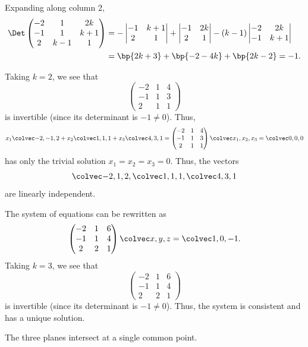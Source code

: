 \begin{solution}
    \begin{ppart}
        Expanding along column 2,
        \begin{align*}
            \Det \begin{pmatrix}-2 & 1 & 2k\\ -1 & 1 & k+1\\ 2 & k-1 & 1\end{pmatrix} &= -\begin{vmatrix}-1 & k+1 \\ 2 & 1\end{vmatrix} + \begin{vmatrix}-1 & 2k \\ 2 & 1\end{vmatrix} - (k-1) \begin{vmatrix}-2 & 2k \\ -1 & k + 1\end{vmatrix}\\
            &= \bp{2k + 3} + \bp{-2 - 4k} + \bp{2k - 2} = -1.
        \end{align*}
    \end{ppart}
    \begin{ppart}
        Taking $k = 2$, we see that \[\begin{pmatrix}-2 & 1 & 4\\ -1 & 1 & 3\\ 2 & 1 & 1\end{pmatrix}\] is invertible (since its determinant is $-1 \neq 0$). Thus, \[x_1 \cveciii{-2}{-1}{2} + x_2 \cveciii111 + x_3 \cveciii431 = \begin{pmatrix}-2 & 1 & 4\\ -1 & 1 & 3\\ 2 & 1 & 1\end{pmatrix} \cveciii{x_1}{x_2}{x_3} = \cveciii000\] has only the trivial solution $x_1 = x_2 = x_3 = 0$. Thus, the vectors \[\cveciii{-2}{1}{2}, \cveciii111, \cveciii431\] are linearly independent.
    \end{ppart}
    \begin{ppart}
        \begin{psubpart}
            The system of equations can be rewritten as \[\begin{pmatrix}-2 & 1 & 6\\ -1 & 1 & 4\\ 2 & 2 & 1\end{pmatrix} \cveciii{x}{y}{z} = \cveciii10{-1}.\] Taking $k = 3$, we see that \[\begin{pmatrix}-2 & 1 & 6\\ -1 & 1 & 4\\ 2 & 2 & 1\end{pmatrix}\] is invertible (since its determinant is $-1 \neq 0$). Thus, the system is consistent and has a unique solution.
        \end{psubpart}
        \begin{psubpart}
            The three planes intersect at a single common point.
        \end{psubpart}
    \end{ppart}
\end{solution}


